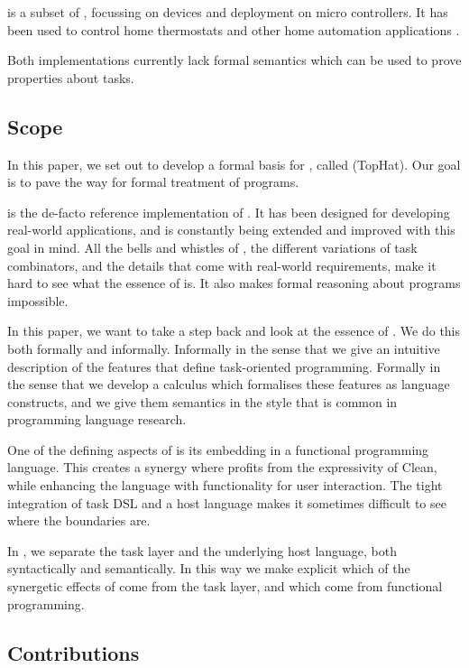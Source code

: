 \MTASKS is a subset of \ITASKS,
focussing on \IOT devices and deployment on micro controllers.
It has been used to control home thermostats and other home automation applications \cite{koopman2018task}.

Both implementations currently lack formal semantics which can be used to prove properties about tasks.



\subsection{Scope}

In this paper, we set out to develop a formal basis for \TOP, called \TOPHAT (TopHat).
Our goal is to pave the way for formal treatment of \TOP programs.

\ITASKS is the de-facto reference implementation of \TOP.
It has been designed for developing real-world applications, and is constantly being extended and improved with this goal in mind.
All the bells and whistles of \ITASKS, the different variations of task combinators, and the details that come with real-world requirements, make it hard to see what the essence of \TOP is.
It also makes formal reasoning about \TOP programs impossible.

In this paper, we want to take a step back and look at the essence of \TOP.
We do this both formally and informally.
Informally in the sense that we give an intuitive description of the features that define task-oriented programming.
Formally in the sense that we develop a calculus which formalises these features as language constructs, and we give them semantics in the style that is common in programming language research.

One of the defining aspects of \ITASKS is its embedding in a functional programming language.
This creates a synergy where \ITASKS profits from the expressivity of Clean, while enhancing the language with functionality for user interaction.
The tight integration of task DSL and a host language makes it sometimes difficult to see where the boundaries are.

In \TOPHAT, we separate the task layer and the underlying host language, both syntactically and semantically.
In this way we make explicit which of the synergetic effects of \TOP come from the task layer, and which come from functional programming.


\subsection{Contributions}

